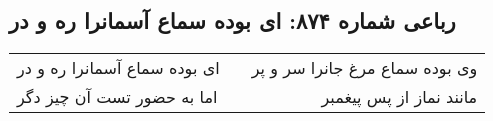 \begin{center}
\section*{رباعی شماره ۸۷۴: ای بوده سماع آسمانرا ره و در}
\label{sec:0874}
\begin{longtable}{l p{0.5cm} r}
ای بوده سماع آسمانرا ره و در
&&
وی بوده سماع مرغ جانرا سر و پر
\\
اما به حضور تست آن چیز دگر
&&
مانند نماز از پس پیغمبر
\\
\end{longtable}
\end{center}
